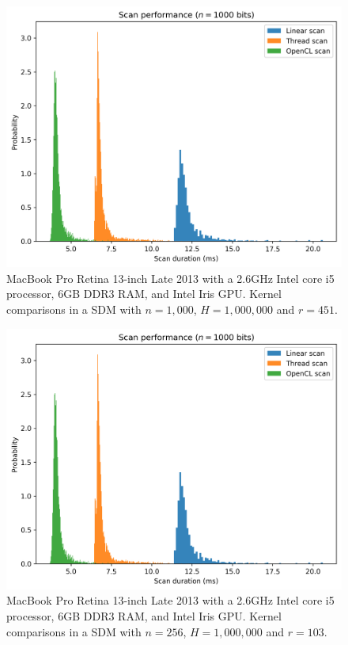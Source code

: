 \begin{figure}[!htb]
\centering\includegraphics[width=\textwidth]{images02/performance/imac-scans-1000.png}
\caption{MacBook Pro Retina 13-inch Late 2013 with a 2.6GHz Intel core i5 processor, 6GB DDR3 RAM, and Intel Iris GPU. Kernel comparisons in a SDM with $n=1,000$, $H=1,000,000$ and $r=451$.
\label{fig:perf-macbook-kernels-1000}}
\end{figure}

\begin{figure}[!htb]
\centering\includegraphics[width=\textwidth]{images02/performance/imac-scans-1000.png}
\caption{MacBook Pro Retina 13-inch Late 2013 with a 2.6GHz Intel core i5 processor, 6GB DDR3 RAM, and Intel Iris GPU. Kernel comparisons in a SDM with $n=256$, $H=1,000,000$ and $r=103$.
\label{fig:perf-macbook-kernels-256}}
\end{figure}


